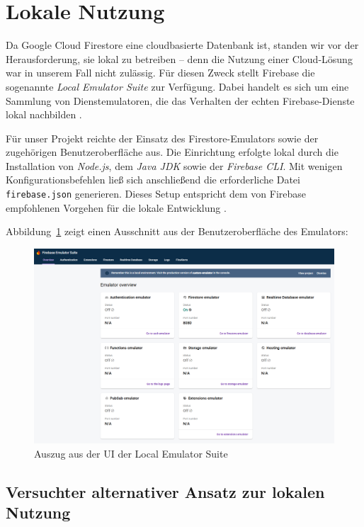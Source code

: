 \documentclass[12pt,a4paper%
              ,oneside     %
              ,titlepage
              ,DIV=13
              ,headinclude
              ,footinclude=false%
              ,cleardoublepage=empty%
              ,parskip=half,
              BCOR=0mm,
              ]{scrreprt}
\begin{document}
\section{Lokale Nutzung}

Da Google Cloud Firestore eine cloudbasierte Datenbank ist, standen wir vor der Herausforderung, sie lokal zu betreiben – denn die Nutzung einer Cloud-Lösung war in unserem Fall nicht zulässig. Für diesen Zweck stellt Firebase die sogenannte \textit{Local Emulator Suite} zur Verfügung. Dabei handelt es sich um eine Sammlung von Dienstemulatoren, die das Verhalten der echten Firebase-Dienste lokal nachbilden \cite{EmulatorSuite.2025}.

Für unser Projekt reichte der Einsatz des Firestore-Emulators sowie der zugehörigen Benutzeroberfläche aus. Die Einrichtung erfolgte lokal durch die Installation von \textit{Node.js}, dem \textit{Java JDK} sowie der \textit{Firebase CLI}. Mit wenigen Konfigurationsbefehlen ließ sich anschließend die erforderliche Datei \texttt{firebase.json} generieren. Dieses Setup entspricht dem von Firebase empfohlenen Vorgehen für die lokale Entwicklung \cite{EmulatorInsall.2025}.

Abbildung~\ref{fig:emulator-ui} zeigt einen Ausschnitt aus der Benutzeroberfläche des Emulators:

\begin{figure}[H]
	\centering
	\includegraphics[width=\linewidth]{img/emulator_ui.png}
	\caption{Auszug aus der UI der Local Emulator Suite}
	\label{fig:emulator-ui}
\end{figure}

\subsection{Versuchter alternativer Ansatz zur lokalen Nutzung}
\end{document}
